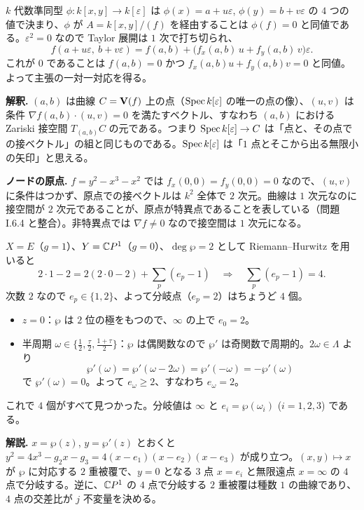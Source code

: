 $k$ 代数準同型 $\phi:k[x,y]\to k[\varepsilon]$ は $\phi(x)=a+u\varepsilon$, $\phi(y)=b+v\varepsilon$ の $4$ つの値で決まり、$\phi$ が $A=k[x,y]/(f)$ を経由することは $\phi(f)=0$ と同値である。$\varepsilon^2=0$ なので Taylor 展開は $1$ 次で打ち切られ、
\[
  f(a+u\varepsilon,\ b+v\varepsilon)=f(a,b)+\bigl(f_x(a,b)\,u+f_y(a,b)\,v\bigr)\varepsilon.
\]
これが $0$ であることは $f(a,b)=0$ かつ $f_x(a,b)u+f_y(a,b)v=0$ と同値。よって主張の一対一対応を得る。

\textbf{解釈.} $(a,b)$ は曲線 $C=\mathbf{V}(f)$ 上の点（$\operatorname{Spec} k[\varepsilon]$ の唯一の点の像）、$(u,v)$ は条件 $\nabla f(a,b)\cdot(u,v)=0$ を満たすベクトル、すなわち $(a,b)$ における Zariski 接空間 $T_{(a,b)}C$ の元である。つまり $\operatorname{Spec} k[\varepsilon]\to C$ は「点と、その点での接ベクトル」の組と同じものである。$\operatorname{Spec} k[\varepsilon]$ は「$1$ 点とそこから出る無限小の矢印」と思える。

\textbf{ノードの原点.} $f=y^2-x^3-x^2$ では $f_x(0,0)=f_y(0,0)=0$ なので、$(u,v)$ に条件はつかず、原点での接ベクトルは $k^2$ 全体で $2$ 次元。曲線は $1$ 次元なのに接空間が $2$ 次元であることが、原点が特異点であることを表している（問題 I.6.4 と整合）。非特異点では $\nabla f\neq0$ なので接空間は $1$ 次元になる。

$X=E$（$g=1$）、$Y=\mathbb{C} P^1$（$g=0$）、$\deg\wp=2$ として Riemann--Hurwitz を用いると
\[
  2\cdot1-2=2(2\cdot0-2)+\sum_p(e_p-1)\quad\Longrightarrow\quad\sum_p(e_p-1)=4.
\]
次数 $2$ なので $e_p\in\{1,2\}$、よって分岐点（$e_p=2$）はちょうど $4$ 個。
\begin{itemize}
  \item $z=0$：$\wp$ は $2$ 位の極をもつので、$\infty$ の上で $e_0=2$。
  \item 半周期 $\omega\in\{\tfrac12,\tfrac\tau2,\tfrac{1+\tau}2\}$：$\wp$ は偶関数なので $\wp'$ は奇関数で周期的。$2\omega\in\Lambda$ より
  \[
    \wp'(\omega)=\wp'(\omega-2\omega)=\wp'(-\omega)=-\wp'(\omega)
  \]
  で $\wp'(\omega)=0$。よって $e_\omega\geq2$、すなわち $e_\omega=2$。
\end{itemize}
これで $4$ 個がすべて見つかった。分岐値は $\infty$ と $e_i=\wp(\omega_i)$ ($i=1,2,3$) である。

\textbf{解説.} $x=\wp(z)$, $y=\wp'(z)$ とおくと $y^2=4x^3-g_2x-g_3=4(x-e_1)(x-e_2)(x-e_3)$ が成り立つ。$(x,y)\mapsto x$ が $\wp$ に対応する $2$ 重被覆で、$y=0$ となる $3$ 点 $x=e_i$ と無限遠点 $x=\infty$ の $4$ 点で分岐する。逆に、$\mathbb{C} P^1$ の $4$ 点で分岐する $2$ 重被覆は種数 $1$ の曲線であり、$4$ 点の交差比が $j$ 不変量を決める。

